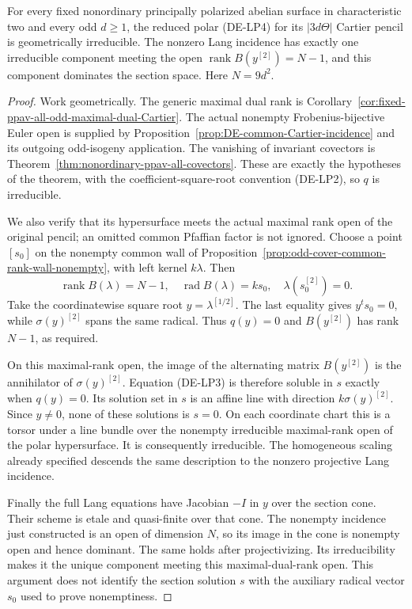 \begin{corollary}
\label{cor:DE-odd-polar-main-component}
For every fixed nonordinary principally polarized abelian surface
in characteristic two and every odd \(d\geq1\), the reduced
polar (DE-LP4) for its \(|3d\Theta|\) Cartier pencil is
geometrically irreducible. The nonzero Lang incidence has exactly
one irreducible component meeting the open
\(\operatorname{rank}B(y^{[2]})=N-1\), and this component
dominates the section space. Here \(N=9d^2\).
\end{corollary}
\begin{proof}
Work geometrically. The generic maximal dual rank is
Corollary~\ref{cor:fixed-ppav-all-odd-maximal-dual-Cartier}.
The actual nonempty Frobenius-bijective Euler open is supplied
by Proposition~\ref{prop:DE-common-Cartier-incidence} and its
outgoing odd-isogeny application. The vanishing of invariant
covectors is Theorem~\ref{thm:nonordinary-ppav-all-covectors}.
These are exactly the hypotheses of the theorem, with the
coefficient-square-root convention (DE-LP2), so \(q\) is
irreducible.

We also verify that its hypersurface meets the actual maximal
rank open of the original pencil; an omitted common Pfaffian
factor is not ignored. Choose a point \([s_0]\) on the nonempty
common wall of Proposition~\ref{prop:odd-cover-common-rank-wall-nonempty},
with left kernel \(k\lambda\). Then
\[
 \operatorname{rank}B(\lambda)=N-1,\quad
 \operatorname{rad}B(\lambda)=ks_0,\quad
                       \lambda(s_0^{[2]})=0.
\]
Take the coordinatewise square root \(y=\lambda^{[1/2]}\).
The last equality gives \(y^ts_0=0\), while
\(\sigma(y)^{[2]}\) spans the same radical. Thus \(q(y)=0\)
and \(B(y^{[2]})\) has rank \(N-1\), as required.

On this maximal-rank open, the image of the alternating matrix
\(B(y^{[2]})\) is the annihilator of
\(\sigma(y)^{[2]}\). Equation (DE-LP3) is therefore soluble
in \(s\) exactly when \(q(y)=0\). Its solution set in \(s\)
is an affine line with direction
\(k\sigma(y)^{[2]}\). Since \(y\ne0\), none of these solutions
is \(s=0\). On each coordinate chart this is a torsor under a
line bundle over the nonempty irreducible maximal-rank open
of the polar hypersurface. It is consequently irreducible.
The homogeneous scaling already specified descends the same
description to the nonzero projective Lang incidence.

Finally the full Lang equations have Jacobian \(-I\) in \(y\)
over the section cone. Their scheme is etale and quasi-finite
over that cone. The nonempty incidence just constructed is an
open of dimension \(N\), so its image in the cone is nonempty
open and hence dominant. The same holds after projectivizing.
Its irreducibility makes it the unique component meeting this
maximal-dual-rank open. This argument does not identify the
section solution \(s\) with the auxiliary radical vector
\(s_0\) used to prove nonemptiness.
\end{proof}

